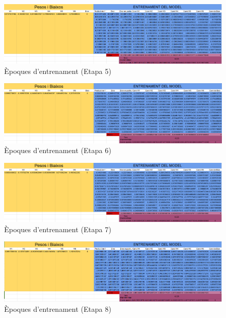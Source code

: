\begin{figure}[H]
    \centering
    \includegraphics[width=1\textwidth]{./figures/Etapa5.png}
    \caption{Èpoques d'entrenament (Etapa 5)}
\end{figure}

\begin{figure}[H]
    \centering
    \includegraphics[width=1\textwidth]{./figures/Etapa6.png}
    \caption{Èpoques d'entrenament (Etapa 6)}
\end{figure}

\begin{figure}[H]
    \centering
    \includegraphics[width=1\textwidth]{./figures/Etapa7.png}
    \caption{Èpoques d'entrenament (Etapa 7)}
\end{figure}

\begin{figure}[H]
    \centering
    \includegraphics[width=1\textwidth]{./figures/Etapa8.png}
    \caption{Èpoques d'entrenament (Etapa 8)}
\end{figure}


